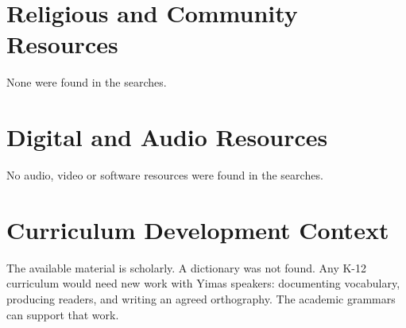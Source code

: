 \documentclass[12pt]{article}
\begin{document}
\section{Religious and Community Resources}
None were found in the searches.

\section{Digital and Audio Resources}
No audio, video or software resources were found in the searches.

\section{Curriculum Development Context}
The available material is scholarly. A dictionary was not found. Any K-12 curriculum would need new work with Yimas speakers: documenting vocabulary, producing readers, and writing an agreed orthography. The academic grammars can support that work.
\end{document}
